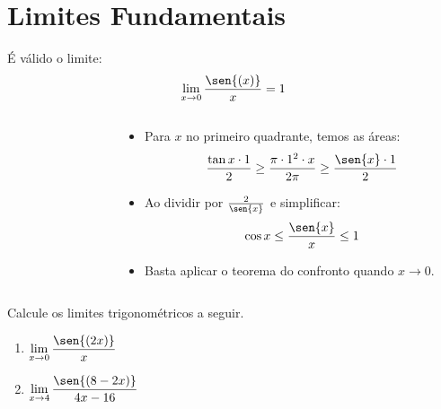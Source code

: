 \section{Limites Fundamentais}

\begin{frame}
  \begin{theorem}
    É válido o limite:
    \begin{equation*}
      \lim_{x\to 0} \dfrac{\sen{(x)}}{x} = 1
    \end{equation*}
  \end{theorem}
  \begin{columns}[onlytextwidth]
    \begin{column}{0.49\textwidth}\vspace{-0.7cm}
      \begin{figure}
      \end{figure}
    \end{column}
    \begin{column}{0.49\textwidth}
      \begin{itemize}
        \item Para $x$ no primeiro quadrante, temos as áreas:
        \begin{equation*}
          \frac{\tan{x}\cdot 1}{2} \geq \frac{\pi\cdot 1^{2}\cdot x}{2\pi} \geq \frac{\sen{x}\cdot 1}{2}
        \end{equation*}
        
        \item Ao dividir por $\frac{2}{\sen{x}}$ e simplificar:
        \begin{equation*}
          \cos{x} \leq \frac{\sen{x}}{x} \leq 1
        \end{equation*}

        \item Basta aplicar o teorema do confronto quando $x\to 0$.
      \end{itemize}
    \end{column}
  \end{columns}
\end{frame}

\begin{frame}
  \begin{example}
    Calcule os limites trigonométricos a seguir.
  \end{example}
  \begin{enumerate}
    \item $\displaystyle\lim_{x\to 0}\dfrac{\sen{(2x)}}{x}$
    \item $\displaystyle\lim_{x\to 4}\dfrac{\sen{(8-2x)}}{4x-16}$
  \end{enumerate}
\end{frame}

